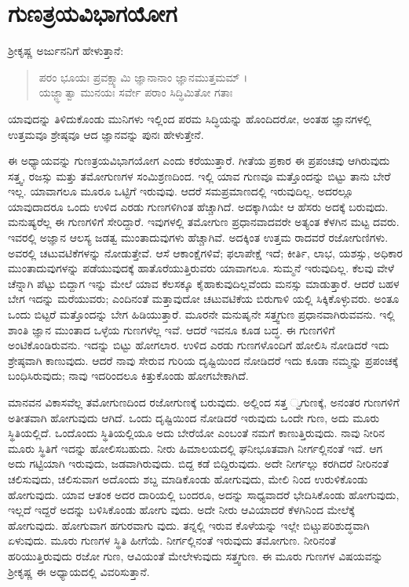 
\chapter{ಗುಣತ್ರಯವಿಭಾಗಯೋಗ}

ಶ್ರೀಕೃಷ್ಣ ಅರ್ಜುನನಿಗೆ ಹೇಳುತ್ತಾನೆ:

\begin{verse}
ಪರಂ ಭೂಯಃ ಪ್ರವಕ್ಷ್ಯಾಮಿ ಜ್ಞಾನಾನಾಂ ಜ್ಞಾನಮುತ್ತಮಮ್ ।\\ಯಜ್ಜ್ಞಾತ್ವಾ ಮುನಯಃ ಸರ್ವೇ ಪರಾಂ ಸಿದ್ಧಿಮಿತೋ ಗತಾಃ 
\end{verse}

{\small ಯಾವುದನ್ನು ತಿಳಿದುಕೊಂಡು ಮುನಿಗಳು ಇಲ್ಲಿಂದ ಪರಮ ಸಿದ್ಧಿಯನ್ನು ಹೊಂದಿದರೋ, ಅಂತಹ ಜ್ಞಾನಗಳಲ್ಲಿ ಉತ್ತಮವೂ ಶ್ರೇಷ್ಠವೂ ಆದ ಜ್ಞಾನವನ್ನು ಪುನಃ ಹೇಳುತ್ತೇನೆ.}

ಈ ಅಧ್ಯಾಯವನ್ನು ಗುಣತ್ರಯವಿಭಾಗಯೋಗ ಎಂದು ಕರೆಯುತ್ತಾರೆ. ಗೀತೆಯ ಪ್ರಕಾರ ಈ ಪ್ರಪಂಚವು ಆಗಿರುವುದು ಸತ್ತ್ವ, ರಜಸ್ಸು ಮತ್ತು ತಮೋಗುಣಗಳ ಸಂಮಿಶ್ರಣದಿಂದ. ಇಲ್ಲಿ ಯಾವ ಗುಣವೂ ಮತ್ತೊಂದನ್ನು ಬಿಟ್ಟು ತಾನು ಬೇರೆ ಇಲ್ಲ. ಯಾವಾಗಲೂ ಮೂರೂ ಒಟ್ಟಿಗೆ ಇರುವುವು. ಆದರೆ ಸಮಪ್ರಮಾಣದಲ್ಲಿ ಇರುವುದಿಲ್ಲ. ಅದರಲ್ಲೂ ಯಾವುದಾದರೂ ಒಂದು ಉಳಿದ ಎರಡು ಗುಣಗಳಿಗಿಂತ ಹೆಚ್ಚಾಗಿದೆ. ಅದಕ್ಕಾಗಿಯೇ ಆ ಹೆಸರು ಅದಕ್ಕೆ ಬರುವುದು. ಮನುಷ್ಯರೆಲ್ಲ ಈ ಗುಣಗಳಿಗೆ ಸೇರಿದ್ದಾರೆ. ಇವುಗಳಲ್ಲಿ ತಮೋಗುಣ ಪ್ರಧಾನವಾದವರೇ ಅತ್ಯಂತ ಕೆಳಗಿನ ಮಟ್ಟ ದವರು. ಇವರಲ್ಲಿ ಅಜ್ಞಾನ ಆಲಸ್ಯ ಜಡತ್ವ ಮುಂತಾದುವುಗಳು ಹೆಚ್ಚಾಗಿವೆ. ಅದಕ್ಕಿಂತ ಉತ್ತಮ ರಾದವರೆ ರಜೋಗುಣಿಗಳು. ಅವರಲ್ಲಿ ಚಟುವಟಿಕೆಗಳನ್ನು ನೋಡುತ್ತೇವೆ. ಆಸೆ ಆಕಾಂಕ್ಷೆಗಳಿವೆ; ಫಲಾಪೇಕ್ಷೆ ಇದೆ; ಕೀರ್ತಿ, ಲಾಭ, ಯಶಸ್ಸು, ಅಧಿಕಾರ ಮುಂತಾದುವುಗಳನ್ನು ಪಡೆಯುವುದಕ್ಕೆ ಹಾತೊರೆಯುತ್ತಿರುವರು ಯಾವಾಗಲೂ. ಸುಮ್ಮನೆ ಇರುವುದಿಲ್ಲ. ಕೆಲವು ವೇಳೆ ಚೆನ್ನಾಗಿ ಪೆಟ್ಟು ಬಿದ್ದಾಗ ಇನ್ನು ಮೇಲೆ ಯಾವ ಕೆಲಸಕ್ಕೂ ಕೈಹಾಕುವುದಿಲ್ಲವೆಂದು ಮನಸ್ಸು ಮಾಡುತ್ತಾರೆ. ಆದರೆ ಬಹಳ ಬೇಗ ಇದನ್ನು ಮರೆಯುವರು; ಎಂದಿನಂತೆ ಮತ್ತಾವುದೋ ಚಟುವಟಿಕೆಯ ಬಿರುಗಾಳಿ ಯಲ್ಲಿ ಸಿಕ್ಕಿಕೊಳ್ಳುವರು. ಅಂತೂ ಒಂದು ಬಿಟ್ಟರೆ ಮತ್ತೊಂದನ್ನು ಬೇಗ ಹಿಡಿಯುತ್ತಾರೆ. ಮೂರನೇ ಮನುಷೃನೇ ಸತ್ತ್ವಗುಣ ಪ್ರಧಾನವಾಗಿರುವವನು. ಇಲ್ಲಿ ಶಾಂತಿ ಜ್ಞಾನ ಮುಂತಾದ ಒಳ್ಳೆಯ ಗುಣಗಳೆಲ್ಲ ಇವೆ. ಆದರೆ ಇವನೂ ಕೂಡ ಬದ್ಧ. ಈ ಗುಣಗಳಿಗೆ ಅಂಟಿಕೊಂಡಿರುವನು. ಇದನ್ನು ಬಿಟ್ಟು ಹೋಗಲಾರ. ಉಳಿದ ಎರಡು ಗುಣಗಳೊಂದಿಗೆ ಹೋಲಿಸಿ ನೋಡಿದರೆ ಇದು ಶ್ರೇಷ್ಠವಾಗಿ ಕಾಣುವುದು. ಆದರೆ ನಾವು ಸೇರುವ ಗುರಿಯ ದೃಷ್ಟಿಯಿಂದ ನೋಡಿದರೆ ಇದು ಕೂಡಾ ನಮ್ಮನ್ನು ಪ್ರಪಂಚಕ್ಕೆ ಬಂಧಿಸಿರುವುದು; ನಾವು ಇದರಿಂದಲೂ ಕಿತ್ತುಕೊಂಡು ಹೋಗಬೇಕಾಗಿದೆ.

ಮಾನವನ ವಿಕಾಸವೆಲ್ಲ ತಮೋಗುಣದಿಂದ ರಜೋಗುಣಕ್ಕೆ ಬರುವುದು. ಅಲ್ಲಿಂದ ಸತ್ತ ್ವಗುಣಕ್ಕೆ, ಅನಂತರ ಗುಣಗಳಿಗೆ ಅತೀತವಾಗಿ ಹೋಗುವುದು ಆಗಿದೆ. ಒಂದು ದೃಷ್ಟಿಯಿಂದ ನೋಡಿದರೆ ಇರುವುದು ಒಂದೇ ಗುಣ, ಅದು ಮೂರು ಸ್ಥಿತಿಯಲ್ಲಿದೆ. ಒಂದೊಂದು ಸ್ಥಿತಿಯಲ್ಲಿಯೂ ಅದು ಬೇರೆಯೋ ಎಂಬಂತೆ ನಮಗೆ ಕಾಣುತ್ತಿರುವುದು. ನಾವು ನೀರಿನ ಮೂರು ಸ್ಥಿತಿಗೆ ಇದನ್ನು ಹೋಲಿಸಬಹುದು. ನೀರು ಹಿಮಾಲಯದಲ್ಲಿ ಘನೀಭೂತವಾಗಿ ನೀರ್ಗಲ್ಲಿನಂತೆ ಇದೆ. ಆಗ ಅದು ಗಟ್ಟಿಯಾಗಿ ಇರುವುದು, ಜಡವಾಗಿರುವುದು. ಬಿದ್ದ ಕಡೆ ಬಿದ್ದಿರುವುದು. ಅದೇ ನೀರ್ಗಲ್ಲು ಕರಗಿದರೆ ನೀರಿನಂತೆ ಚಲಿಸುವುದು, ಚಲಿಸುವಾಗ ಅದೊಂದು ಶಬ್ದ ಮಾಡಿಕೊಂಡು ಹೋಗುವುದು, ಮೇಲಿ ನಿಂದ ಉರುಳಿಕೊಂಡು ಹೋಗುವುದು. ಯಾವ ಆತಂಕ ಅದರ ದಾರಿಯಲ್ಲಿ ಬಂದರೂ, ಅದನ್ನು ಸಾಧ್ಯವಾದರೆ ಭೇದಿಸಿಕೊಂಡು ಹೋಗುವುದು, ಇಲ್ಲದೆ ಇದ್ದರೆ ಅದನ್ನು ಬಳಿಸಿಕೊಂಡು ಹೋಗು ವುದು. ಅದೇ ನೀರು ಆವಿಯಾದರೆ ಕೆಳಗಿನಿಂದ ಮೇಲೆಕ್ಕೆ ಹೋಗುವುದು. ಹೋಗುವಾಗ ಹಗುರವಾಗು ವುದು. ತನ್ನಲ್ಲಿ ಇರುವ ಕೊಳೆಯನ್ನು ಇಲ್ಲೇ ಬಿಟ್ಚುಪರಿಶುದ್ಧವಾಗಿ ಏಳುವುದು. ಮೂರು ಗುಣಗಳ ಸ್ಥಿತಿ ಹೀಗೆಯೆ. ನೀರ್ಗಲ್ಲಿನಂತೆ ಇರುವುದು ತಮೋಗುಣ. ನೀರಿನಂತೆ ಹರಿಯುತ್ತಿರುವುದು ರಜೋ ಗುಣ, ಆವಿಯಂತೆ ಮೇಲೇಳುವುದು ಸತ್ತ್ವಗುಣ. ಈ ಮೂರು ಗುಣಗಳ ವಿಷಯವನ್ನು ಶ್ರೀಕೃಷ್ಣ ಈ ಅಧ್ಯಾಯದಲ್ಲಿ ವಿವರಿಸುತ್ತಾನೆ.

